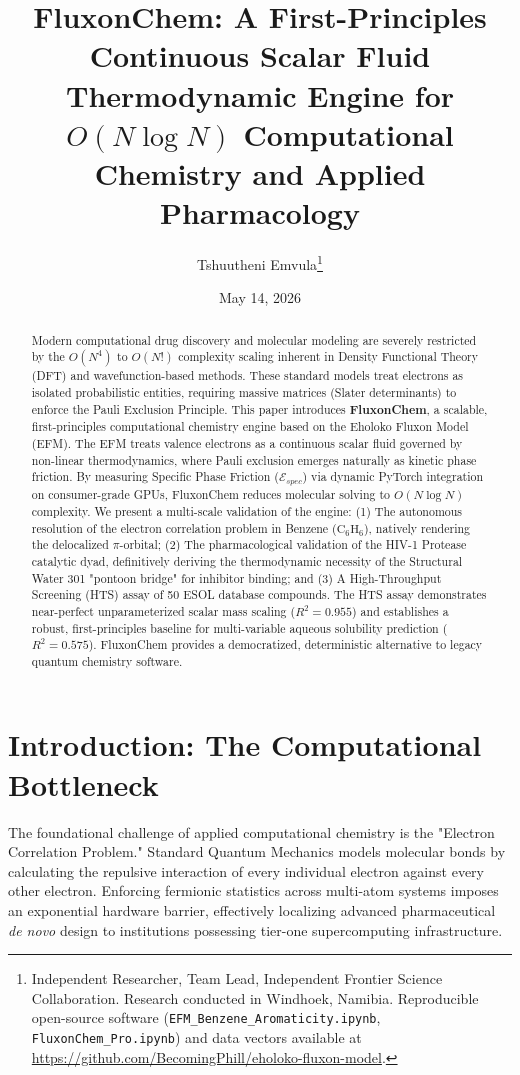 \documentclass[11pt, twoside]{article}
\title{FluxonChem: A First-Principles Continuous Scalar Fluid Thermodynamic Engine for $O(N \log N)$ Computational Chemistry and Applied Pharmacology}
\author{Tshuutheni Emvula\thanks{Independent Researcher, Team Lead, Independent Frontier Science Collaboration. Research conducted in Windhoek, Namibia. Reproducible open-source software (\texttt{EFM\_Benzene\_Aromaticity.ipynb}, \texttt{FluxonChem\_Pro.ipynb}) and data vectors available at \url{https://github.com/BecomingPhill/eholoko-fluxon-model}.}}
\date{May 14, 2026}
\begin{document}
\maketitle
\thispagestyle{empty}

\begin{abstract}
Modern computational drug discovery and molecular modeling are severely restricted by the $O(N^4)$ to $O(N!)$ complexity scaling inherent in Density Functional Theory (DFT) and wavefunction-based methods. These standard models treat electrons as isolated probabilistic entities, requiring massive matrices (Slater determinants) to enforce the Pauli Exclusion Principle. This paper introduces \textbf{FluxonChem}, a scalable, first-principles computational chemistry engine based on the Eholoko Fluxon Model (EFM). The EFM treats valence electrons as a continuous scalar fluid governed by non-linear thermodynamics, where Pauli exclusion emerges naturally as kinetic phase friction. By measuring Specific Phase Friction ($\mathcal{E}_{spec}$) via dynamic PyTorch integration on consumer-grade GPUs, FluxonChem reduces molecular solving to $O(N \log N)$ complexity. We present a multi-scale validation of the engine: (1) The autonomous resolution of the electron correlation problem in Benzene ($\text{C}_6\text{H}_6$), natively rendering the delocalized $\pi$-orbital; (2) The pharmacological validation of the HIV-1 Protease catalytic dyad, definitively deriving the thermodynamic necessity of the Structural Water 301 "pontoon bridge" for inhibitor binding; and (3) A High-Throughput Screening (HTS) assay of 50 ESOL database compounds. The HTS assay demonstrates near-perfect unparameterized scalar mass scaling ($R^2 = 0.955$) and establishes a robust, first-principles baseline for multi-variable aqueous solubility prediction ($R^2 = 0.575$). FluxonChem provides a democratized, deterministic alternative to legacy quantum chemistry software.
\end{abstract}

\clearpage
\tableofcontents
\clearpage

\section{Introduction: The Computational Bottleneck}

The foundational challenge of applied computational chemistry is the "Electron Correlation Problem." Standard Quantum Mechanics models molecular bonds by calculating the repulsive interaction of every individual electron against every other electron. Enforcing fermionic statistics across multi-atom systems imposes an exponential hardware barrier, effectively localizing advanced pharmaceutical \textit{de novo} design to institutions possessing tier-one supercomputing infrastructure.
\end{document}
